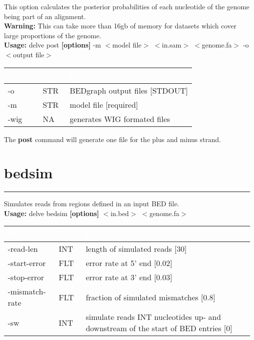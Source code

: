 \documentclass[11pt,a4paper,oneside]{book}
\begin{document}
This option calculates the posterior probabilities of each nucleotide of the genome being part of an alignment.\\

{\bf Warning:} This can take more than 16gb of memory for datasets which cover large proportions of the genome.\\

{\bf Usage:} delve post  {\bf [options]} -m $<$model file$>$ $<$in.sam$>$ $<$genome.fa$>$ -o $<$output file$>$\\


\begin{center}
\begin{tabular}{| l | l | p{12cm}|}
\hline
\rowcolor{blue} \textcolor{white}{\scshape Option}		&\textcolor{white}{\scshape Type}		&	\textcolor{white}{\scshape Description}\\ \hline
-o & STR & BEDgraph output files [STDOUT]\\
-m  & STR  &  model file [required]\\
-wig & NA & generates WIG formated files\\
\hline
\end{tabular}
\end{center}

The {\bf post} command will generate one file for the plus and minus strand. 




\section{bedsim}
\rule[1cm]{\textwidth}{1pt}

Simulates reads from regions defined in an input BED file.\\    

{\bf Usage:} delve bedsim {\bf [options]} $<$in.bed$>$ $<$genome.fa$>$\\


\begin{center}
\begin{tabular}{| l | l | p{12cm}|}
\hline
\rowcolor{blue} \textcolor{white}{\scshape Option}		&\textcolor{white}{\scshape Type}		&	\textcolor{white}{\scshape Description}\\ \hline
-read-len & INT & length of simulated reads [30]\\
-start-error & FLT & error rate at 5' end [0.02]\\
-stop-error & FLT & error rate at 3' end [0.03]\\
-mismatch-rate & FLT & fraction of simulated mismatches [0.8]\\
-sw    &        INT   &  simulate reads INT nucleotides up- and downstream of the start of BED entries [0]\\

\hline
\end{tabular}
\end{center}
\end{document}
